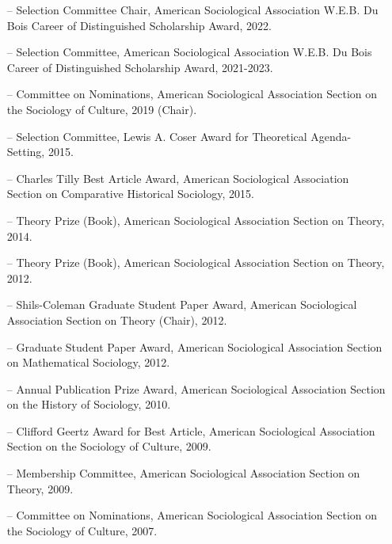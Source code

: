\begin{itemize}[itemsep=-0.5ex] 
    \item[--] Selection Committee Chair, American Sociological Association W.E.B. Du Bois Career of Distinguished Scholarship Award, 2022.
    
    \item[--] Selection Committee, American Sociological Association W.E.B. Du Bois Career of Distinguished Scholarship Award, 2021-2023.
    
    \item[--] Committee on Nominations, American Sociological Association Section on the Sociology of Culture, 2019 (Chair).
    
    \item[--] Selection Committee, Lewis A. Coser Award for Theoretical Agenda-Setting, 2015.
    
    \item[--] Charles Tilly Best Article Award, American Sociological Association Section on Comparative Historical Sociology, 2015.
    
    \item[--] Theory Prize (Book), American Sociological Association Section on Theory, 2014.
    
    \item[--] Theory Prize (Book), American Sociological Association Section on Theory, 2012.
    
    \item[--] Shils-Coleman Graduate Student Paper Award, American Sociological Association Section on Theory (Chair), 2012.
    
    \item[--] Graduate Student Paper Award, American Sociological Association Section on Mathematical Sociology, 2012.
    
    \item[--] Annual Publication Prize Award, American Sociological Association Section on the History of Sociology, 2010.
    
    \item[--] Clifford Geertz Award for Best Article, American Sociological Association Section on the Sociology of Culture, 2009.
    
    \item[--] Membership Committee, American Sociological Association Section on Theory, 2009.
    
    \item[--] Committee on Nominations, American Sociological Association Section on the Sociology of Culture, 2007.
\end{itemize}